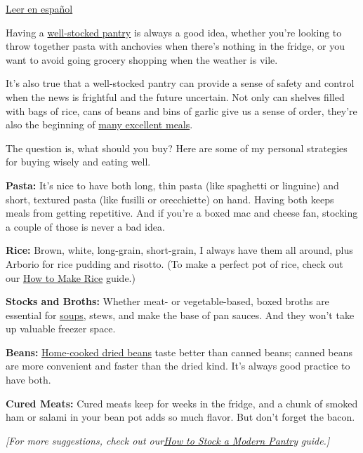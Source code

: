 \href{https://www.nytimes3xbfgragh.onion/es/2020/03/12/espanol/despensa-alacena-cuarentena.html}{Leer
en español}

Having a
\href{https://cooking.nytimes3xbfgragh.onion/guides/56-how-to-stock-a-modern-pantry}{well-stocked
pantry} is always a good idea, whether you're looking to throw together
pasta with anchovies when there's nothing in the fridge, or you want to
avoid going grocery shopping when the weather is vile.

It's also true that a well-stocked pantry can provide a sense of safety
and control when the news is frightful and the future uncertain. Not
only can shelves filled with bags of rice, cans of beans and bins of
garlic give us a sense of order, they're also the beginning of
\href{https://cooking.nytimes3xbfgragh.onion/68861692-nyt-cooking/13993006-pantry-recipes}{many
excellent meals}.

The question is, what should you buy? Here are some of my personal
strategies for buying wisely and eating well.

\textbf{Pasta:} It's nice to have both long, thin pasta (like spaghetti
or linguine) and short, textured pasta (like fusilli or orecchiette) on
hand. Having both keeps meals from getting repetitive. And if you're a
boxed mac and cheese fan, stocking a couple of those is never a bad
idea.

\textbf{Rice:} Brown, white, long-grain, short-grain, I always have them
all around, plus Arborio for rice pudding and risotto. (To make a
perfect pot of rice, check out our
\href{https://cooking.nytimes3xbfgragh.onion/guides/49-how-to-make-rice}{How
to Make Rice} guide.)

\textbf{Stocks and Broths:} Whether meat- or vegetable-based, boxed
broths are essential for
\href{https://cooking.nytimes3xbfgragh.onion/guides/40-how-to-make-soup}{soups},
stews, and make the base of pan sauces. And they won't take up valuable
freezer space.

\textbf{Beans:}
\href{https://cooking.nytimes3xbfgragh.onion/guides/21-how-to-cook-beans}{Home-cooked
dried beans} taste better than canned beans; canned beans are more
convenient and faster than the dried kind. It's always good practice to
have both.

\textbf{Cured Meats:} Cured meats keep for weeks in the fridge, and a
chunk of smoked ham or salami in your bean pot adds so much flavor. But
don't forget the bacon.

\emph{{[}For more suggestions, check out
our}\href{https://cooking.nytimes3xbfgragh.onion/guides/56-how-to-stock-a-modern-pantry}{\emph{How
to Stock a Modern Pantry}} \emph{guide.{]}}


